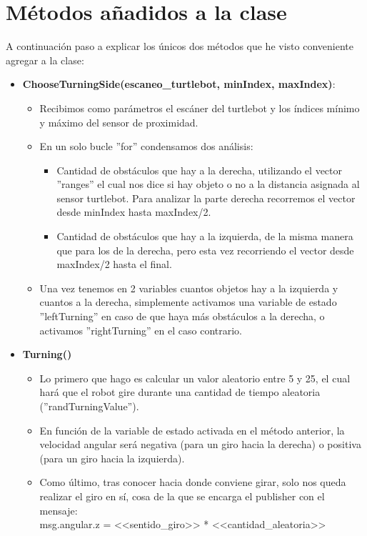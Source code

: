 \newpage

\section{Métodos añadidos a la clase}

A continuación paso a explicar los únicos dos métodos que he visto conveniente agregar a la clase:
\\
\begin{itemize}
	\item \textbf{ChooseTurningSide(escaneo\_turtlebot, minIndex, maxIndex)}:
		\begin{itemize}
			\item Recibimos como parámetros el escáner del turtlebot y los índices mínimo y máximo del sensor de proximidad.
			\item En un solo bucle ''for'' condensamos dos análisis:
				\begin{itemize}
					\item Cantidad de obstáculos que hay a la derecha, utilizando el vector ''ranges'' el cual nos dice si hay objeto o no a la distancia asignada al sensor turtlebot. Para analizar la parte derecha recorremos el vector desde minIndex hasta maxIndex/2.
					\item Cantidad de obstáculos que hay a la izquierda, de la misma manera que para los de la derecha, pero esta vez recorriendo el vector desde maxIndex/2 hasta el final.
				\end{itemize}
			\item Una vez tenemos en 2 variables cuantos objetos hay a la izquierda y cuantos a la derecha, simplemente activamos una variable de estado ''leftTurning'' en caso de que haya más obstáculos a la derecha, o activamos ''rightTurning'' en el caso contrario.
		\end{itemize}
	

	\item \textbf{Turning()}
		\begin{itemize}
			\item Lo primero que hago es calcular un valor aleatorio entre 5 y 25, el cual hará que el robot gire durante una cantidad de tiempo aleatoria (''randTurningValue'').
			\item En función de la variable de estado activada en el método anterior, la velocidad angular será negativa (para un giro hacia la derecha) o positiva (para un giro hacia la izquierda).
			\item Como último, tras conocer hacia donde conviene girar, solo nos queda realizar el giro en sí, cosa de la que se encarga el publisher con el mensaje:\\ msg.angular.z = <<sentido\_giro>> * <<cantidad\_aleatoria>>
		\end{itemize}
\end{itemize}


